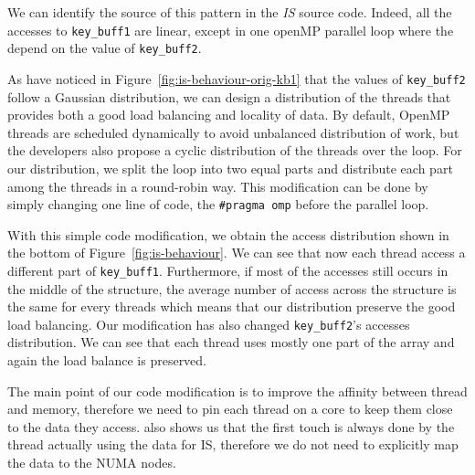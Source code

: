 We can identify the source of this pattern in the \emph{IS} source code. Indeed, all the accesses to \texttt{key\_buff1} are linear,
except in one openMP parallel loop where the depend on the value of
\texttt{key\_buff2}.

As have noticed in Figure~\ref{fig:is-behaviour-orig-kb1} that the values of \texttt{key\_buff2}
follow a Gaussian distribution, we can design a distribution of the threads that
provides both a good load balancing and locality of data.
By default, OpenMP threads are scheduled dynamically to avoid unbalanced
distribution of work, but the developers also propose a cyclic distribution
of the threads over the loop.
For our distribution, we split
the loop into two equal parts and distribute each part among the threads in a round-robin way.
This modification can be done by simply changing one line of code, the
\texttt{\#pragma omp} before the parallel loop.



With this simple code modification, we obtain the access distribution shown in
the bottom of Figure~\ref{fig:is-behaviour}. We can see that now each thread
access a different part of \texttt{key\_buff1}. Furthermore, if most of the
accesses still occurs in the middle of the structure, the average number of
access across the structure is the same for every threads which means that our
distribution preserve the good load balancing. Our modification has also
changed \texttt{key\_buff2}'s accesses distribution. We can see that each
thread uses mostly one part of the array and again the load balance is
preserved.

The main point of our code modification is to improve the affinity between
thread and memory, therefore we need to pin each thread on a core to keep them
close to the data they access. %
\TABARNAC also shows us that the first touch is always done by the thread actually using
the data for IS, therefore we do not need to explicitly map the data to the NUMA nodes.

